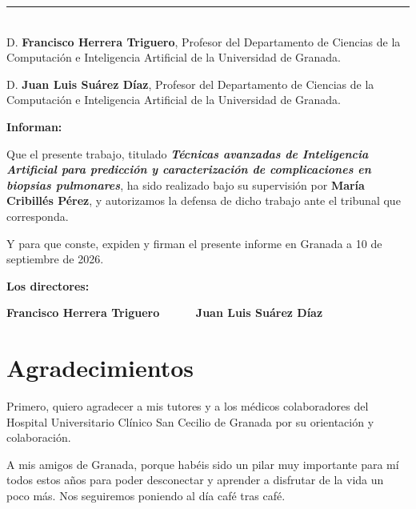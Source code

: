 \noindent\rule[-1ex]{\textwidth}{2pt}\\[4.5ex]

D. \textbf{Francisco Herrera Triguero}, Profesor del Departamento de Ciencias de la Computación e Inteligencia Artificial de la Universidad de Granada.

\vspace{0.5cm}

D. \textbf{Juan Luis Suárez Díaz}, Profesor del Departamento de Ciencias de la Computación e Inteligencia Artificial de la Universidad de Granada.


\vspace{0.5cm}

\textbf{Informan:}

\vspace{0.5cm}

Que el presente trabajo, titulado \textit{\textbf{Técnicas avanzadas de Inteligencia Artificial para predicción y caracterización de complicaciones en biopsias pulmonares}},
ha sido realizado bajo su supervisión por \textbf{María Cribillés Pérez}, y autorizamos la defensa de dicho trabajo ante el tribunal
que corresponda.

\vspace{0.5cm}

Y para que conste, expiden y firman el presente informe en Granada a 10 de septiembre de 2026.

\vspace{1cm}

\textbf{Los directores:}

\vspace{5cm}

\noindent \textbf{Francisco Herrera Triguero \ \ \ \ \ Juan Luis Suárez Díaz}

\chapter*{Agradecimientos}
\thispagestyle{empty}

       \vspace{1cm}


Primero, quiero agradecer a mis tutores y a los médicos colaboradores del Hospital Universitario Clínico San Cecilio de Granada por su orientación y colaboración. 

A mis amigos de Granada, porque habéis sido un pilar muy importante para mí todos estos años para poder desconectar y aprender a disfrutar de la vida un poco más. Nos seguiremos poniendo al día café tras café. 

